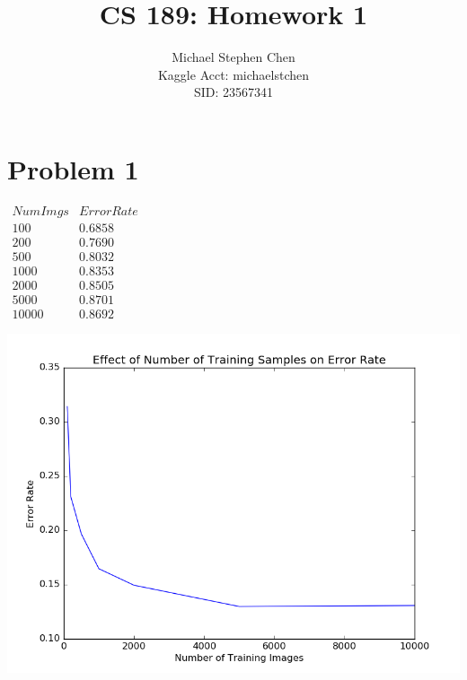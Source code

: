 \documentclass{article}
\title{CS 189: Homework 1}
\author{Michael Stephen Chen\\ Kaggle Acct: michaelstchen \\SID: 23567341}
\begin{document}
\maketitle

\pagebreak

\section*{Problem 1}
\begin{center}
$\begin{array}{cc}
  Num Imgs & Error Rate \\
  100      & 0.6858     \\
  200      & 0.7690     \\
  500      & 0.8032     \\
  1000     & 0.8353     \\
  2000     & 0.8505     \\
  5000     & 0.8701     \\
  10000    & 0.8692
\end{array}$


\includegraphics[scale=0.5]{errplot}
\end{center}
\end{document}
